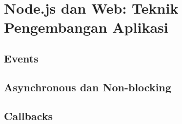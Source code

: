 \chapter{Node.js dan Web: Teknik Pengembangan Aplikasi}

\section{Events}

\section{Asynchronous dan Non-blocking}


\section{Callbacks}


